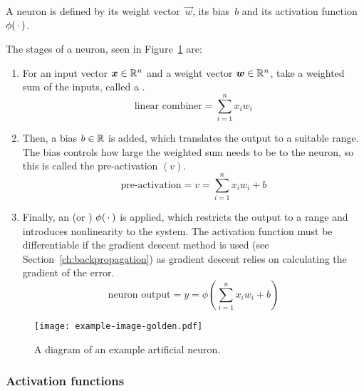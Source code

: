 
A neuron is defined by its weight vector~\(\vec{w}\), its bias~\(b\) and its activation function~\(\phi(\,\cdot\,)\).

The stages of a neuron, seen in Figure~\ref{fig:neuron-example} are:
\begin{enumerate}
	\item For an input vector \(\bm{x} \in \mathbb{R}^n\) and a weight vector \(\bm{w} \in \mathbb{R}^n\), take a weighted sum of the inputs, called a .
	      \[ \text{linear combiner} = \sum_{i=1}^{n}{x_i w_i} \]
	\item Then, a bias \(b \in \mathbb{R}{}\) is added, which translates the output to a suitable range.
	      The bias controls how large the weighted sum needs to be to  the neuron, so this is called the pre-activation \((v)\).
	      \[ \text{pre-activation} = v = \sum_{i=1}^{n}{x_i w_i} + b \]
	\item Finally, an  (or ) \(\phi(\,\cdot\,)\) is applied, which restricts the output to a range and introduces nonlinearity to the system.
	      The activation function must be differentiable if the gradient descent method is used (see Section~\ref{ch:backpropagation}) as gradient descent relies on calculating the gradient of the error.
	      \[ \text{neuron output} = y = \phi\left(\sum_{i=1}^{n}{x_i w_i} + b \right) \]
\end{enumerate}

\begin{figure}[htbp]
	\centering
	\texttt{[image: example-image-golden.pdf]}
	\caption{A diagram of an example artificial neuron.}
	\label{fig:neuron-example}
\end{figure}

\subsubsection{Activation functions}

